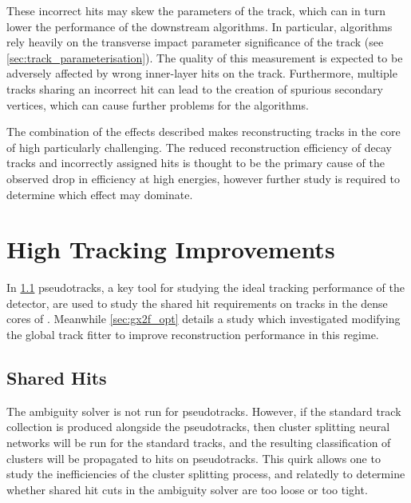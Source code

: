 These incorrect hits may skew the parameters of the track, which can in turn lower the performance of the downstream \btagging algorithms.
In particular, \btagging algorithms rely heavily on the transverse impact parameter significance \dzerosig of the track (see \cref{sec:track_parameterisation}).
The quality of this measurement is expected to be adversely affected by wrong inner-layer hits on the track.
Furthermore, multiple tracks sharing an incorrect hit can lead to the creation of spurious secondary vertices, which can cause further problems for the \btagging algorithms.

The combination of the effects described makes reconstructing tracks in the core of high \pT \bjets particularly challenging.
The reduced reconstruction efficiency of \bhadron decay tracks and incorrectly assigned hits is thought to be the primary cause of the observed drop in \btagging efficiency at high energies, however further study is required to determine which effect may dominate.



\section{High \texorpdfstring{\pT}{pT} \texorpdfstring{\bhadron}{b-hadron} Tracking Improvements}\label{sec:b_track_reco_improvements}

In \cref{sec:sharedhits} pseudotracks, a key tool for studying the ideal tracking performance of the \ATLAS detector, are used to study the shared hit requirements on tracks in the dense cores of \highpt \bjets.
Meanwhile \cref{sec:gx2f_opt} details a study which investigated modifying the global track fitter to improve reconstruction performance in this regime.


\subsection{Shared Hits}\label{sec:sharedhits}

The ambiguity solver is not run for pseudotracks.
However, if the standard track collection is produced alongside the pseudotracks, then cluster splitting neural networks will be run for the standard tracks, and the resulting classification of clusters will be propagated to hits on pseudotracks.
This quirk allows one to study the inefficiencies of the cluster splitting process, and relatedly to determine whether shared hit cuts in the ambiguity solver are too loose or too tight.

